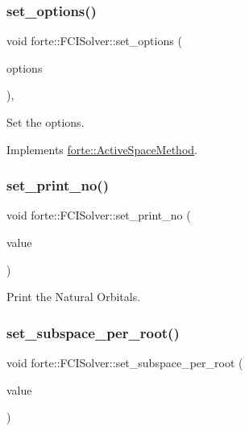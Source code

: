 \subsubsection{\texorpdfstring{set\+\_\+options()}{set\_options()}}
{\footnotesize\ttfamily void forte\+::\+F\+C\+I\+Solver\+::set\+\_\+options (\begin{DoxyParamCaption}\item[{std\+::shared\+\_\+ptr$<$ \mbox{\hyperlink{classforte_1_1_forte_options}{Forte\+Options}} $>$}]{options }\end{DoxyParamCaption})\hspace{0.3cm}{\ttfamily [override]}, {\ttfamily [virtual]}}



Set the options. 



Implements \mbox{\hyperlink{classforte_1_1_active_space_method_a9416a627f550d4d56f6b8ffe7478ed89}{forte\+::\+Active\+Space\+Method}}.

\mbox{\label{classforte_1_1_f_c_i_solver_a369b5d6855b896d2d1a743dd3ff2d9a6}} 
\subsubsection{\texorpdfstring{set\+\_\+print\+\_\+no()}{set\_print\_no()}}
{\footnotesize\ttfamily void forte\+::\+F\+C\+I\+Solver\+::set\+\_\+print\+\_\+no (\begin{DoxyParamCaption}\item[{bool}]{value }\end{DoxyParamCaption})\hspace{0.3cm}{\ttfamily [inline]}}



Print the Natural Orbitals. 

\mbox{\label{classforte_1_1_f_c_i_solver_a412a3fe22b7b6dbacb97d42c37bd07a2}} 
\subsubsection{\texorpdfstring{set\+\_\+subspace\+\_\+per\+\_\+root()}{set\_subspace\_per\_root()}}
{\footnotesize\ttfamily void forte\+::\+F\+C\+I\+Solver\+::set\+\_\+subspace\+\_\+per\+\_\+root (\begin{DoxyParamCaption}\item[{int}]{value }\end{DoxyParamCaption})}



